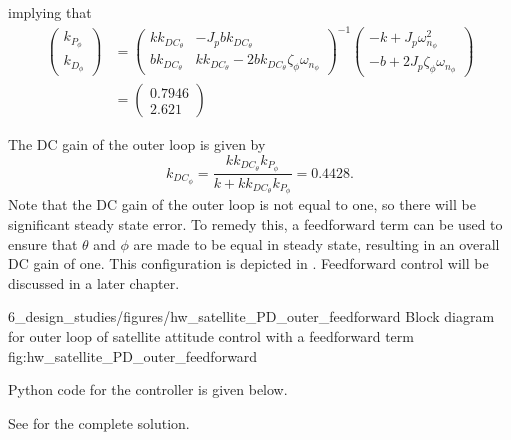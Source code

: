 implying that
\begin{align*}
\begin{pmatrix}k_{P_\phi}\\k_{D_\phi}\end{pmatrix} &= \begin{pmatrix} kk_{DC_\theta} & -J_pbk_{DC_\theta} \\ bk_{DC_\theta} & kk_{DC_\theta}-2bk_{DC_\theta}\zeta_\phi\omega_{n_\phi} \end{pmatrix}^{-1} 
	\begin{pmatrix} -k + J_p\omega_{n_\phi}^2 \\ -b + 2J_p\zeta_\phi\omega_{n_\phi} \end{pmatrix} \\
	&= \begin{pmatrix} 0.7946 \\ 2.621 \end{pmatrix}
\end{align*}

The DC gain of the outer loop is given by
\[
k_{DC_{\phi}} = \frac{kk_{DC_\theta}k_{P_\phi}}{k+kk_{DC_\theta}k_{P_\phi}} = 0.4428.
\]
Note that the DC gain of the outer loop is not equal to one, so there will be significant steady state error. To remedy this, a feedforward term can be used to ensure that $\theta$ and $\phi$ are made to be equal in steady state, resulting in an overall DC gain of one. This configuration is depicted in . Feedforward control will be discussed in a later chapter.

	{6_design_studies/figures/hw_satellite_PD_outer_feedforward}
	{Block diagram for outer loop of satellite attitude control with a feedforward term}
	{fig:hw_satellite_PD_outer_feedforward}

Python code for the controller is given below.



See  for the complete solution.
